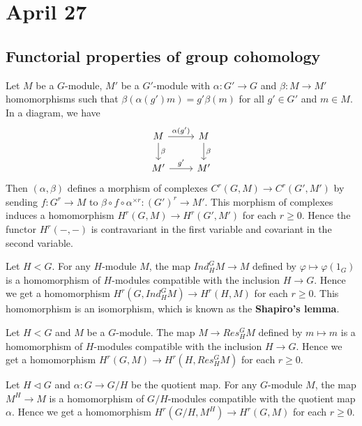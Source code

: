 \section{April 27}

\subsection{Functorial properties of group cohomology}

  Let $M$ be a $G$-module, $M'$ be a $G'$-module with $\alpha: G' \to G$ and $\beta: M \to M'$ homomorphisms such that $\beta(\alpha(g')m) = g'\beta(m)$ for all $g' \in G'$ and $m \in M$. 
  In a diagram, we have
  \[
    \begin{tikzcd}
      M \arrow[r, "\alpha(g')"] \arrow[d, "\beta"] & M \arrow[d, "\beta"] \\
      M' \arrow[r, "g'"] & M'
    \end{tikzcd}
  \]
  Then $(\alpha, \beta)$ defines a morphism of complexes $C^r(G, M) \to C^r(G', M')$ by sending $f: G^r \to M$ to $\beta \circ f \circ \alpha^{\times r}: (G')^r \to M'$.
  This morphism of complexes induces a homomorphism $H^r(G, M) \to H^r(G', M')$ for each $r \geq 0$.
  Hence the functor $H^r(-, -)$ is contravariant in the first variable and covariant in the second variable.

  \begin{example}
    Let $H < G$. 
    For any $H$-module $M$, the map $Ind_H^G M \to M$ defined by $\varphi \mapsto \varphi(1_G)$ is a homomorphism of $H$-modules compatible with the inclusion $H \to G$.
    Hence we get a homomorphism $H^r(G, Ind_H^G M) \to H^r(H, M)$ for each $r \geq 0$.
    This homomorphism is an isomorphism, which is known as the \textbf{Shapiro's lemma}.
  \end{example}

  \begin{example}
    Let $H < G$ and $M$ be a $G$-module.
    The map $M \to Res_H^G M$ defined by $m \mapsto m$ is a homomorphism of $H$-modules compatible with the inclusion $H \to G$.
    Hence we get a homomorphism $H^r(G, M) \to H^r(H, Res_H^G M)$ for each $r \geq 0$.
  \end{example}

  \begin{example}
    Let $H \triangleleft G$ and $\alpha: G \to G/H$ be the quotient map.
    For any $G$-module $M$, the map $M^H \to M$ is a homomorphism of $G/H$-modules compatible with the quotient map $\alpha$.
    Hence we get a homomorphism $H^r(G/H, M^H) \to H^r(G, M)$ for each $r \geq 0$.
  \end{example}

